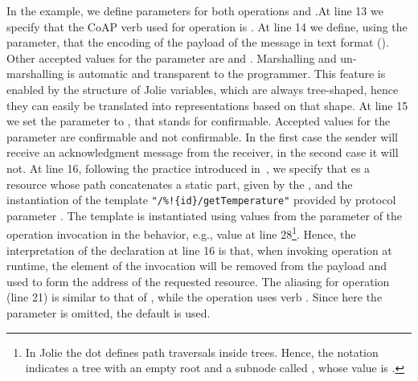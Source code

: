 In the example, we define  parameters for both operations
 and .\@ At line 13 we specify that the CoAP verb
used for operation  is . At line 14 we define, using
the  parameter, that the encoding of the payload of the
message in text format (). Other accepted values for the
 parameter are  and . Marshalling
and un-marshalling is automatic and transparent to the programmer. This feature
is enabled by the structure of Jolie variables, which are always tree-shaped,
hence they can easily be translated into representations based on that shape.
At line 15 we set the  parameter to
, that stands for confirmable. Accepted values for the
 parameter are confirmable and not confirmable. In the
first case the sender will receive an acknowledgment message from the
receiver, in the second case it will not. At line 16, following the practice
introduced in~\cite{montesi16}, we specify that  es a
resource whose path concatenates a static part, given by the ,
and the instantiation of the template \lstinline|"/%!{id}/getTemperature"|
provided by protocol parameter . The template is instantiated
using values from the parameter of the operation invocation in the behavior,
e.g., value  at line 28\footnote{In Jolie the dot  defines
path traversals inside trees. Hence, the notation 
indicates a tree with an empty root and a subnode called , whose
value is .}. Hence, the interpretation of the declaration at line 16
is that, when invoking operation  at runtime, the element
 of the invocation will be removed from the payload and used to form
the address of the requested resource. The aliasing for operation
 (line 21) is similar to that of , while the
operation uses verb . Since here the 
parameter is omitted, the default  is used.


